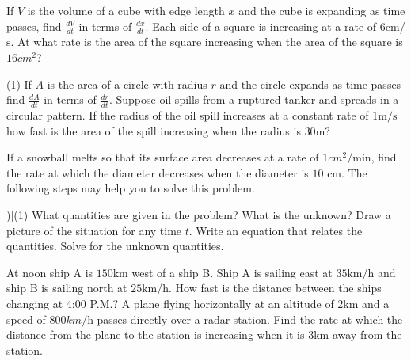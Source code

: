 \begin{Exercise}[title={Related Rates},label=exRelatedRates]
	\Question If $V$ is the volume of a cube with edge length $x$ and the cube is expanding as time passes, find $\frac{d V}{d t}$ in terms of $\frac{d x}{d t}$. %
	\Question Each side of a square is increasing at a rate of $6 \mbox{cm}$/$\mbox{s}$. At what rate is the area of	the square increasing when the area of the square is $16 cm^{2}$?  %
	\Question 
	\begin{tasks}(1)
		\task  If $A$ is the area of a circle with radius $r$ and the circle expands as time passes find $\frac{d A}{d t}$ in terms of $\frac{d r}{d t}$. %
		\task  Suppose oil spills from a ruptured tanker and spreads in a circular pattern. If the radius of the oil spill increases at a constant rate of $1 \mathrm{m}/\mbox{s}$ how fast is the area of the spill increasing when the radius is $30 \mbox{m}$? %
	\end{tasks}
	
	\Question If a snowball melts so that its surface area decreases at a rate of $1 cm^{2}$/$\mbox{min}$, find the rate at which the diameter decreases when the diameter is $10$ $\mbox{cm}$. The following steps may help you to solve this problem. %
	\begin{tasks}[counter-format=(tsk[r])](1)
		\task What quantities are given in the problem? 
		\task What is the unknown?
		\task Draw a picture of the situation for any time $t$. 
		\task Write an equation that relates the quantities. 
		\task Solve for the unknown quantities.		
	\end{tasks}
	\Question At noon ship A is $150 \mbox{km}$ west of a ship B. Ship A is sailing east at $35 \mbox{km}$/$\mbox{h}$ and ship B is sailing north at $25 \mbox{km}$/$\mbox{h}$. How fast is the distance between the ships changing at 4:00 P.M.? %
	\Question A plane flying horizontally at an altitude of $2 \mbox{km}$ and a speed of $800 km/\mbox{h}$ passes directly over a radar station. Find the rate at which the distance from the plane to the station is increasing when it is $3 \mbox{km}$ away from the station.%


\end{Exercise}
